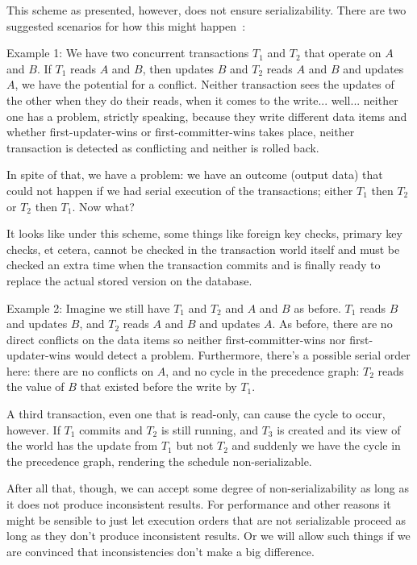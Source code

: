 This scheme as presented, however, does not ensure serializability. There are two suggested scenarios for how this might happen~\cite{dsc}:

Example 1: We have two concurrent transactions $T_{1}$ and $T_{2}$ that operate on $A$ and $B$. If $T_{1}$ reads $A$ and $B$, then updates $B$ and $T_{2}$ reads $A$ and $B$ and updates $A$, we have the potential for a conflict. Neither transaction sees the updates of the other when they do their reads, when it comes to the write... well... neither one has a problem, strictly speaking, because they write different data items and whether first-updater-wins or first-committer-wins takes place, neither transaction is detected as conflicting and neither is rolled back.

In spite of that, we have a problem: we have an outcome (output data) that could not happen if we had serial execution of the transactions; either $T_{1}$ then $T_{2}$ or $T_{2}$ then $T_{1}$. Now what? 

It looks like under this scheme, some things like foreign key checks, primary key checks, et cetera, cannot be checked in the transaction world itself and must be checked an extra time when the transaction commits and is finally ready to replace the actual stored version on the database.

Example 2: Imagine we still have $T_{1}$ and $T_{2}$ and $A$ and $B$ as before. $T_{1}$ reads $B$ and updates $B$, and $T_{2}$ reads $A$ and $B$ and updates $A$. As before, there are no direct conflicts on the data items so neither first-committer-wins nor first-updater-wins would detect a problem. Furthermore, there's a possible serial order here: there are no conflicts on $A$, and no cycle in the precedence graph: $T_{2}$ reads the value of $B$ that existed before the write by $T_{1}$. 

A third transaction, even one that is read-only, can cause the cycle to occur, however. If $T_{1}$ commits and $T_{2}$ is still running, and $T_{3}$ is created and its view of the world has the update from $T_{1}$ but not $T_{2}$ and suddenly we have the cycle in the precedence graph, rendering the schedule non-serializable.

After all that, though, we can accept some degree of non-serializability as long as it does not produce inconsistent results. For performance and other reasons it might be sensible to just let execution orders that are not serializable proceed as long as they don't produce inconsistent results.  Or we will allow such things if we are convinced that inconsistencies don't make a big difference. 

